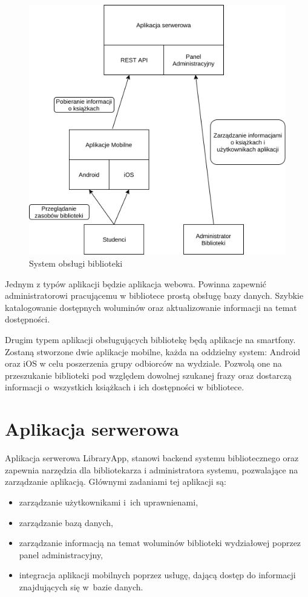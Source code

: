 \documentclass[twoside]{projektInzynierskiMS}
\begin{document}
\begin{figure}[h]
  \centering
  \includegraphics[width=0.8\linewidth]{img/bibsys/SystemDiagram.png}
  \caption{System obsługi biblioteki}
  \label{fig:adminLogin}
\end{figure}

Jednym z typów aplikacji będzie aplikacja webowa. Powinna zapewnić administratorowi pracującemu w bibliotece prostą obsługę bazy danych. Szybkie katalogowanie dostępnych woluminów oraz aktualizowanie informacji na temat dostępności.

Drugim typem aplikacji obsługujących bibliotekę będą aplikacje na smartfony. Zostaną stworzone dwie aplikacje mobilne, każda na oddzielny system: Android oraz iOS w celu poszerzenia grupy odbiorców na wydziale. Pozwolą one na przeszukanie biblioteki pod względem dowolnej szukanej frazy oraz dostarczą informacji o~wszystkich książkach i ich dostępności w bibliotece.


\section{Aplikacja serwerowa}
Aplikacja serwerowa LibraryApp, stanowi backend systemu bibliotecznego oraz zapewnia narzędzia dla bibliotekarza i administratora systemu, pozwalające na zarządzanie aplikacją. Głównymi zadaniami tej aplikacji są:
\begin{itemize}
	\item zarządzanie użytkownikami i~ich uprawnienami,
	\item zarządzanie bazą danych,
	\item zarządzanie informacją na temat woluminów biblioteki wydziałowej poprzez panel administracyjny,
	\item integracja aplikacji mobilnych poprzez usługę, dającą dostęp do informacji znajdujących się w~bazie danych.
\end{itemize}
\end{document}
